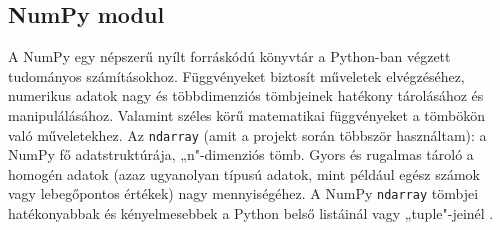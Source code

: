 \subsection{NumPy modul}
A NumPy egy népszerű nyílt forráskódú könyvtár a Python-ban végzett tudományos számításokhoz. Függvényeket biztosít műveletek elvégzéséhez, numerikus adatok nagy és többdimenziós tömbjeinek hatékony tárolásához és manipulálásához. Valamint széles körű matematikai függvényeket a tömbökön való műveletekhez. Az \verb|ndarray| (amit a projekt során többször használtam): a NumPy fő adatstruktúrája, „n"-dimenziós tömb. Gyors és rugalmas tároló a homogén adatok (azaz ugyanolyan típusú adatok, mint például egész számok vagy lebegőpontos értékek) nagy mennyiségéhez. A NumPy \verb|ndarray| tömbjei hatékonyabbak és kényelmesebbek a Python belső listáinál vagy „tuple"-jeinél \cite{numpycite}.





